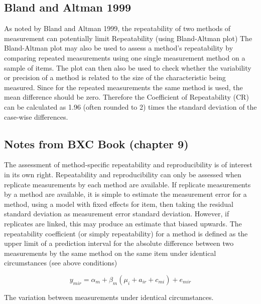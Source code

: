 \documentclass[Chap2cmain.tex]{subfiles}
\begin{document}
\subsection{Bland and Altman 1999}
As noted by Bland and Altman 1999, the repeatability of two methods of measurement can  potentially limit
Repeatability (using Bland-Altman plot)
The Bland-Altman plot may also be used to assess a method’s repeatability by comparing repeated measurements using one single measurement method on a sample of items.
The plot can then also be used to check whether the variability or precision of a method is related to the size of the characteristic being measured.
Since for the repeated measurements the same method is used, the mean difference should be zero.
Therefore the Coefficient of Repeatability (CR) can be calculated as 1.96 (often rounded to 2) times the standard deviation of the case-wise differences.

\subsection{Notes from BXC Book (chapter 9)}
The assessment of method-specific repeatability and reproducibility is of interest in its own right.
Repeatability and reproducibility can only be assessed when replicate measurements by each method are available.
If replicate measurements by a method are available, it is simple to estimate the measurement error for a method, using a model with fixed effects for item, then taking the residual standard deviation as measurement error standard deviation.
However, if replicates are linked, this may produce an estimate that biased upwards.
The repeatability coefficient (or simply repeatability) for a method is defined as the upper limit of a
prediction interval for the absolute difference between two measurements by the same method on the same
item under identical circumstances (see above conditions)

\[y_{mir}  = \alpha_{m} + \beta_m( \mu_i + a_{ir} + c_{mi}) + e_{mir}\]

The variation between measurements under identical circumstances.



\end{document}
